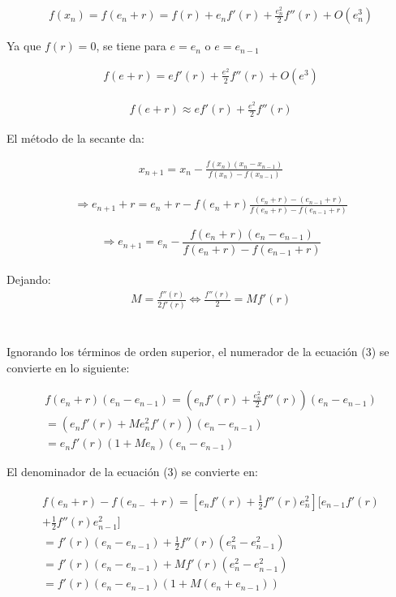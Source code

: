 \begin{gather*}
f(x_{n})= f(e_n+r) = f(r)+e_{n}f'(r)+\frac{e^{2}_n}{2}f''(r)+O(e^{3}_n)
\end{gather*}

Ya que $f(r)=0$, se tiene para $e=e_n$ o $e=e_{n-1}$

\begin{gather*}
f(e+r)= e f'(r)+\frac{e^{2}}{2}f''(r)+O(e^{3})
\end{gather*}

\begin{gather*}
f(e+r) \approx e f'(r)+\frac{e^{2}}{2}f''(r)
\end{gather*}

El método de la secante da:

\begin{gather*}
x_{n+1 }= x_{n} - \frac{f(x_{n})(x_{n}-x_{n-1})}{f(x_{n})-f(x_{n-1})} 
\end{gather*}

\begin{gather*}
\Rightarrow e_{n+1}+r= e_{n} + r - f(e_n + r) \frac{(e_n +r) -(e_{n-1}+r)}{f(e_n + r)-f(e_{n-1} + r)} 
\end{gather*}

\begin{equation}
\Rightarrow e_{n+1}= e_{n} - \frac{f(e_n + r)(e_n - e_{n-1})}{f(e_n + r)-f(e_{n-1} + r)} 
\end{equation}\\

Dejando:\\

\begin{gather*}
M= \frac{f''(r)}{2f'(r)} \Leftrightarrow \frac{f''(r)}{2} = Mf'(r)
\end{gather*}\\\\

Ignorando los términos de orden superior, el numerador de la ecuación (3) se convierte en lo siguiente:

\begin{gather*}
    f(e_n +r)(e_n - e_{n-1})= (e_nf'(r)+\frac{e^{2}_n}{2}f''(r))(e_n -e_{n-1}) \\
    = (e_nf'(r)+Me^{2}_nf'(r))(e_n -e_{n-1}) \\
    = e_nf'(r)(1+Me_n)(e_n -e_{n-1})
\end{gather*} 

El denominador de la ecuación (3) se convierte en:


\begin{gather*}
    f(e_n +r)-f(e_{n-} +r)= [e_nf'(r)+\frac{1}{2}f''(r)e^{2}_n][e_{n-1}f'(r) \\
    +\frac{1}{2}f''(r)e^{2}_{n-1}] \\
    = f'(r)(e_n-e_{n-1})+\frac{1}{2}f''(r)(e^{2}_n -e^{2}_{n-1}) \\
    = f'(r)(e_n-e_{n-1})+Mf'(r)(e^{2}_n -e^{2}_{n-1}) \\
    = f'(r)(e_n-e_{n-1})(1+M(e_n +e_{n-1})) \\
\end{gather*}


